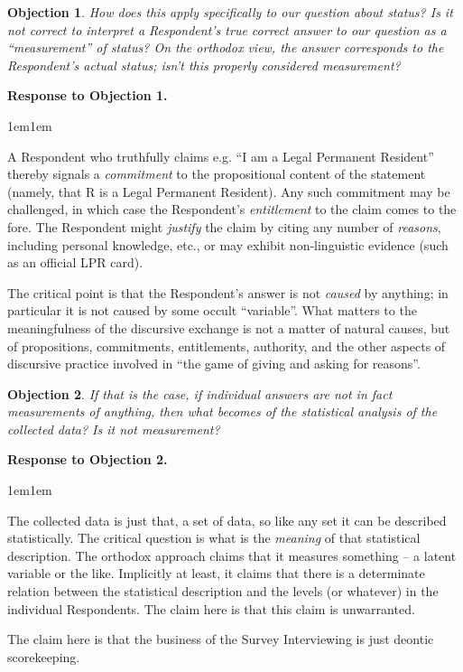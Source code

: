 \documentclass[11pt,twoside]{article}
\newtheorem{objection}{Objection}
\newenvironment*{response}[1][]{\noindent
\textbf{Response to Objection #1.}
\begin{adjustwidth}{1em}{1em}
}
{\end{adjustwidth}
\vspace{1ex}
}
\newcommand{\SIV}{Survey Interviewing}
\newcommand{\R}{Respondent}
\newcommand{\LPR}{Legal Permanent Resident}
\begin{document}
\begin{objection}
  How does this apply specifically to our question about status?  Is
  it not correct to interpret a \R{}'s true correct answer to our
  question as a \enquote{measurement} of status?  On the orthodox
  view, the answer corresponds to the \R{}'s actual status; isn't this
  properly considered measurement?
\end{objection}
\begin{response}[1]
  A \R{} who truthfully claims e.g. \enquote{I am a \LPR{}} thereby
  signals a \textit{commitment} to the propositional content of the
  statement (namely, that R is a \LPR{}).  Any such commitment may be
  challenged, in which case the \R{}'s \textit{entitlement} to the
  claim comes to the fore.  The \R{} might \textit{justify} the claim
  by citing any number of \textit{reasons}, including personal
  knowledge, etc., or may exhibit non-linguistic evidence (such as an
  official LPR card).

  The critical point is that the \R{}'s answer is not \textit{caused}
  by anything; in particular it is not caused by some occult
  \enquote{variable}.  What matters to the meaningfulness of the
  discursive exchange is not a matter of natural causes, but of
  propositions, commitments, entitlements, authority, and the other
  aspects of discursive practice involved in \enquote{the game of
    giving and asking for reasons}.
\end{response}


\begin{objection}
  If that is the case, if individual answers are not in fact
  measurements of anything, then what becomes of the statistical
  analysis of the collected data?  Is it not measurement?
\end{objection}

\begin{response}[2]
  The collected data is just that, a set of data, so like any set it
  can be described statistically.  The critical question is what is
  the \textit{meaning} of that statistical description.  The orthodox
  approach claims that it measures something -- a latent variable or
  the like.  Implicitly at least, it claims that there is a
  determinate relation between the statistical description and the
  levels (or whatever) in the individual \R{}s.  The claim here is
  that this claim is unwarranted.

  The claim here is that the business of the \SIV{} is just deontic
  scorekeeping.
\end{response}
\end{document}
